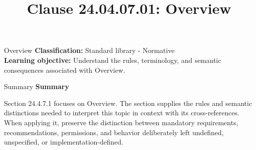 \documentclass[10pt,letterpaper]{article}
\title{Clause 24.04.07.01: Overview}
\author{}
\date{}
\begin{document}
\maketitle
\begin{CornellOverviewBox}{Overview}
\textbf{Classification:} Standard library - Normative\\[2pt]
\textbf{Learning objective:} Understand the rules, terminology, and semantic consequences associated with Overview.
\end{CornellOverviewBox}\begin{CornellSummaryBox}{Summary}
{\sffamily\bfseries\color{Accent} Summary}\par\vspace{3pt}Section 24.4.7.1 focuses on Overview. The section supplies the rules and semantic distinctions needed to interpret this topic in context with its cross-references. When applying it, preserve the distinction between mandatory requirements, recommendations, permissions, and behavior deliberately left undefined, unspecified, or implementation-defined.
\end{CornellSummaryBox}
\end{document}
